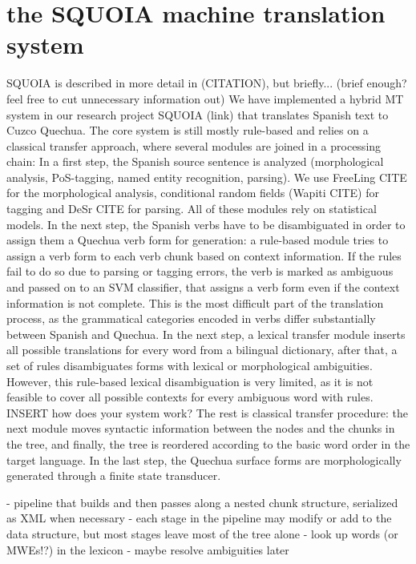 \documentclass[10pt, a4paper]{article}
\begin{document}
\section{the SQUOIA machine translation system}
SQUOIA is described in more detail in (CITATION), but briefly...
(brief enough? feel free to cut unnecessary information out)
We have implemented a hybrid MT system in our research project SQUOIA (link) that translates Spanish text to Cuzco Quechua. The core system is still mostly rule-based and relies on a classical transfer approach, where several modules are joined in a processing chain: In a first step, the Spanish source sentence is analyzed (morphological analysis, PoS-tagging, named entity recognition, parsing). We use FreeLing CITE for the morphological analysis, conditional random fields (Wapiti CITE) for tagging and DeSr CITE for parsing. All of these modules rely on statistical models. In the next step, the Spanish verbs have to be disambiguated in order to assign them a Quechua verb form for generation: a rule-based module tries to assign a verb form to each verb chunk based on context information. If the rules fail to do so due to parsing or tagging errors, the verb is marked as ambiguous and passed on to an SVM classifier, that assigns a verb form even if the context information is not complete. This is the most difficult part of the translation process, as the grammatical categories encoded in verbs differ substantially between Spanish and Quechua.
In the next step, a lexical transfer module inserts all possible translations for every word from a bilingual dictionary, after that, a set of rules disambiguates forms with lexical or morphological ambiguities. However, this rule-based lexical disambiguation is very limited, as it is not feasible to cover all possible contexts for every ambiguous word with rules. INSERT how does your system work?
The rest is classical transfer procedure: the next module moves syntactic information between the nodes and the chunks in the tree, and finally, the tree is reordered according to the basic word order in the target language. In the last step, the Quechua surface forms are morphologically generated through a finite state transducer.




- pipeline that builds and then passes along a nested chunk structure, serialized as XML when necessary
- each stage in the pipeline may modify or add to the data structure, but most stages leave most of the tree alone
- look up words (or MWEs!?) in the lexicon
- maybe resolve ambiguities later
\end{document}
